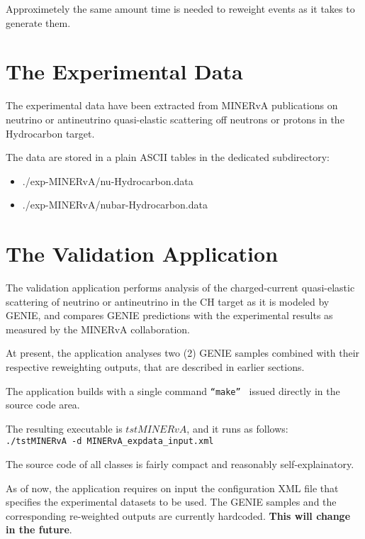 Approximetely the same amount time is needed to reweight events as it takes to generate them.

\section{The Experimental Data}

The experimental data have been extracted from MINERvA publications\cite{minerva1} on neutrino or antineutrino 
quasi-elastic scattering off neutrons or protons in the Hydrocarbon target. 

The data are stored in a plain ASCII tables in the dedicated subdirectory:
\begin{itemize}
\item{./exp-MINERvA/nu-Hydrocarbon.data}
\item{./exp-MINERvA/nubar-Hydrocarbon.data}
\end{itemize}

\section{The Validation Application}

The validation application performs analysis of the charged-current quasi-elastic scattering of neutrino 
or antineutrino in the CH target as it is modeled by GENIE, and compares GENIE predictions with the
experimental results as measured by the MINERvA collaboration.

At present, the application analyses two (2) GENIE samples combined with their respective reweighting
outputs, that are described in earlier sections.

The application builds with a single command {\tt ``make'' } issued directly in the source code area.

The resulting executable is $tstMINERvA$, and it runs as follows: \\
{\tt ./tstMINERvA -d MINERvA\_expdata\_input.xml }

The source code of all classes is fairly compact and reasonably self-explainatory.


As of now, the application requires on input the configuration XML file that specifies the experimental
datasets to be used. The GENIE samples and the corresponding re-weighted outputs are currently hardcoded. 
{\bf This will change in the future}.

